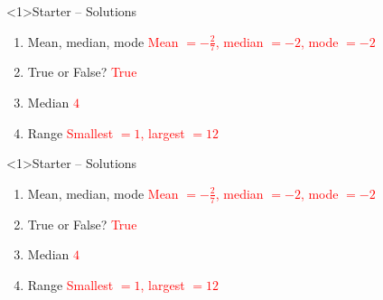 \documentclass{beamer}
\begin{document}
\begin{frame}<1>{Starter -- Solutions}
\vspace{-0.8em}

\footnotesize
\begin{enumerate}\itemsep2pt
  \item Mean, median, mode  
        \textcolor{red}{Mean $=-\frac{2}{7}$, median $=-2$, mode $=-2$}
  \item True or False?  
        \textcolor{red}{True}
  \item Median  
        \textcolor{red}{$4$}
  \item Range  
        \textcolor{red}{Smallest $=1$, largest $=12$}
\end{enumerate}
\end{frame}
\begin{frame}<1>{Starter -- Solutions}
\vspace{-0.8em}

\footnotesize
\begin{enumerate}\itemsep2pt
  \item Mean, median, mode  
        \textcolor{red}{Mean $=-\frac{2}{7}$, median $=-2$, mode $=-2$}
  \item True or False?  
        \textcolor{red}{True}
  \item Median  
        \textcolor{red}{$4$}
  \item Range  
        \textcolor{red}{Smallest $=1$, largest $=12$}
\end{enumerate}
\end{frame}
\end{document}
